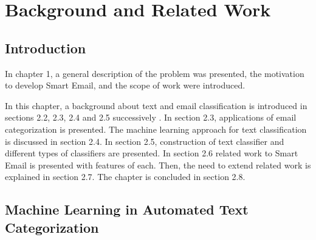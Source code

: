 \newenvironment{my_itemize}
{\begin{itemize}
  \setlength{\itemsep}{0cm}
  \setlength{\parskip}{0cm}}
{\end{itemize}}
\newenvironment{my_enumerate}
{\begin{enumerate}
  \setlength{\itemsep}{0cm}
  \setlength{\parskip}{0cm}}
{\end{enumerate}}

\chapter{Background and Related Work} %

\label{Chapter2} %



\section{Introduction}
In chapter 1, a general description of the problem was presented, the motivation 
to develop Smart Email, and the scope of work were introduced.

In this chapter, a background about text and email classification is introduced in
sections 2.2, 2.3, 2.4 and 2.5 successively . In section 2.3, applications of 
email categorization is presented. The machine learning approach for text 
classification is discussed in section 2.4. In section 2.5, construction of 
text classifier and different types of classifiers are presented. In section 2.6 
related work to Smart Email is presented with features of each. Then, the need to
extend related work is explained in section 2.7. The chapter is concluded in section 2.8.


\section{Machine Learning in Automated Text Categorization}
